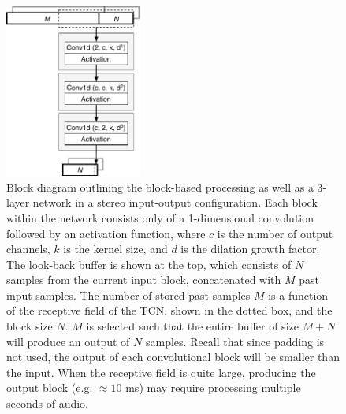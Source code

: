 \documentclass{article}
\begin{document}
\vspace{0.6cm}

\begin{figure}[htb!]
  \centering
  \includegraphics[width=0.4\textwidth]{figs/plugin-diagram-v2.pdf}  
  \caption{Block diagram outlining the block-based processing as well as a 3-layer network in a stereo input-output configuration. 
  Each block within the network consists only of a 1-dimensional convolution followed by an activation function,
  where $c$ is the number of output channels, $k$ is the kernel size, and $d$ is the dilation growth factor.
  The look-back buffer is shown at the top, which consists of $N$ samples from the current input block, 
  concatenated with $M$ past input samples. The number of stored past samples $M$ is a function 
  of the receptive field of the TCN, shown in the dotted box, and the block size $N$. 
  $M$ is selected such that the entire buffer of size $M+N$ will produce an output of $N$ samples.
  Recall that since padding is not used, the output of each convolutional block will be smaller than the input. 
  When the receptive field is quite large, producing the output block (e.g. $\approx 10$ ms)
   may require processing multiple seconds of audio.}
  \label{fig:arch}
\end{figure} 
\end{document}

